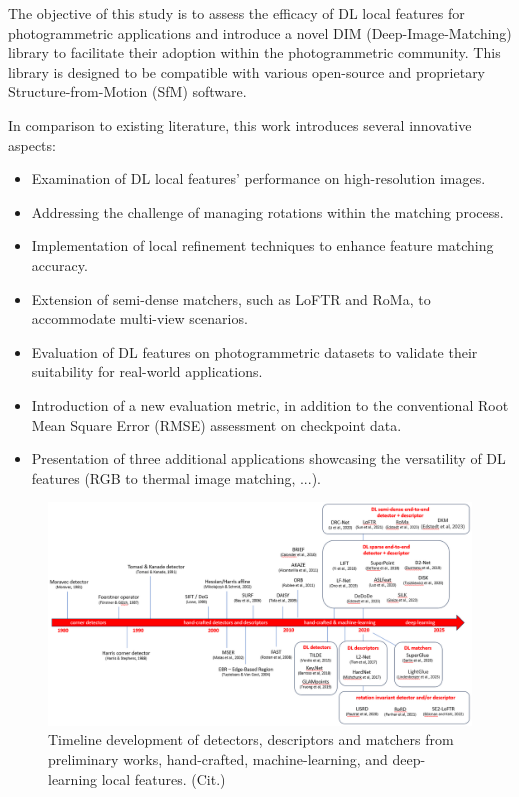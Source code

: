 The objective of this study is to assess the efficacy of DL local features for photogrammetric applications and introduce a novel DIM (Deep-Image-Matching) library to facilitate their adoption within the photogrammetric community. This library is designed to be compatible with various open-source and proprietary Structure-from-Motion (SfM) software. 

In comparison to existing literature, this work introduces several innovative aspects: 
\begin{itemize}
    \item Examination of DL local features' performance on high-resolution images. 
    \item  Addressing the challenge of managing rotations within the matching process. 
    \item Implementation of local refinement techniques to enhance feature matching accuracy. 
    \item Extension of semi-dense matchers, such as LoFTR and RoMa, to accommodate multi-view scenarios. 
    \item Evaluation of DL features on photogrammetric datasets to validate their suitability for real-world applications. 
    \item Introduction of a new evaluation metric, in addition to the conventional Root Mean Square Error (RMSE) assessment on checkpoint data. 
    \item Presentation of three additional applications showcasing the versatility of DL features (RGB to thermal image matching, ...). 
\end{itemize}

\begin{figure}
    \centering
    \includegraphics[width=1\textwidth]{local_feats_history}
    \caption{Timeline development of detectors, descriptors and matchers from preliminary works, hand-crafted, machine-learning, and deep-learning local features. (Cit.)}
    \label{fig:5:feats_history}
\end{figure}


